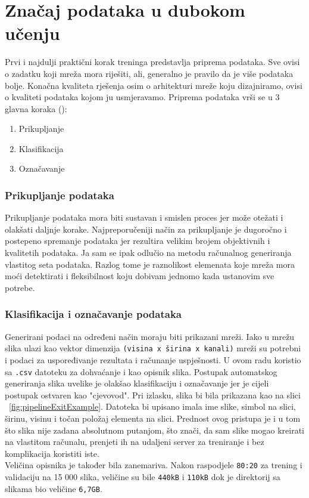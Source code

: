 \section{Značaj podataka u dubokom učenju}
Prvi i najdulji praktični korak treninga predstavlja priprema podataka. 
Sve ovisi o zadatku koji mreža mora riješiti, ali, generalno je pravilo da je više podataka bolje.
Konačna kvaliteta rješenja osim o arhitekturi mreže koju dizajniramo, ovisi o kvaliteti podataka kojom ju usmjeravamo.
Priprema podataka vrši se u 3 glavna koraka (\cite{generalDatasets}):
\begin{enumerate}
\item Prikupljanje
\item Klasifikacija
\item Označavanje
\end{enumerate} 
\subsubsection{Prikupljanje podataka}
Prikupljanje podataka mora biti sustavan i smislen proces jer može otežati i olakšati daljnje korake. 
Najpreporučeniji način za prikupljanje je dugoročno i postepeno spremanje podataka jer rezultira velikim brojem objektivnih i kvalitetih podataka.
Ja sam se ipak odlučio na metodu računalnog generiranja vlastitog seta podataka. 
Razlog tome je raznolikost elemenata koje mreža mora moći detektirati i fleksibilnost koju dobivam jednomo kada ustanovim sve potrebe.
\subsubsection{Klasifikacija i označavanje podataka}
Generirani podaci na određeni način moraju biti prikazani mreži. 
Iako u mrežu slika ulazi kao vektor dimenzija \texttt{(visina x širina x kanali)} mreži su potrebni i podaci za uspoređivanje rezultata i računanje uspješnosti.
U ovom radu koristio sa \texttt{.csv} datoteku za dohvaćanje i kao opisnik slika. 
Postupak automatskog generiranja slika uvelike je olakšao klasifikaciju i označavanje jer je cijeli postupak ostvaren kao "cjevovod".
Pri izlasku, slika bi bila prikazana kao na slici ~\ref{fig:pipelineExitExample}.
Datoteka bi upisano imala ime slike, simbol na slici, širinu, visinu i točan položaj elementa na slici. 
Prednost ovog pristupa je i u tom što slika nije zadana absolutnom putanjom, što znači, da sam slike mogao kreirati na vlastitom računalu, prenjeti ih na udaljeni server za treniranje i bez komplikacija koristiti iste. \\
Veličina opisnika je također bila zanemariva. 
Nakon raspodjele \texttt{80:20} za trening i validaciju na 15 000 slika, veličine su bile \texttt{440kB} i \texttt{110kB} dok je direktorij sa slikama bio veličine \texttt{6,7GB}.

